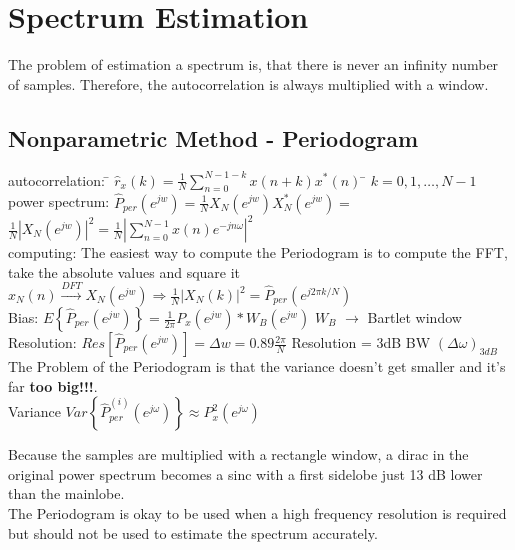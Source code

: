 \section{Spectrum Estimation}
The problem of estimation a spectrum is, that there is never an infinity number of samples.
Therefore, the autocorrelation is always multiplied with a window.

\subsection{Nonparametric Method - Periodogram }
\begin{tabbing}
autocorrelation: 	\= $\hat{r}_x(k) =\frac{1}{N} \sum \limits_{n=0}^{N-1-k} x(n+k)x^*(n)$   \hspace{4cm} \= $k=0,1,\ldots,N-1$ \\
power spectrum:  	\>  $\hat{P}_{per}(e^{jw}) = \frac{1}{N} X_N(e^{jw})X^*_N(e^{jw}) = $\\
\>					$\frac{1}{N}  \left\lvert X_N(e^{jw}) \right\rvert ^2 =  \frac{1}{N}  \left\lvert \sum\limits_{n=0}^{N-1} x(n)e^{-jn\omega} \right\rvert ^2$   \\
computing:  		\> The easiest way to compute the Periodogram is to compute the FFT, take the absolute values and square it\\
					\> $x_N(n) \xrightarrow{DFT} X_N(e^{jw}) \Rightarrow \frac{1}{N}  \left\lvert X_N(k) \right\rvert ^2 = \hat{P}_{per}(e^{j 2 \pi k/N})$ \\
Bias: 				\>  $E\left\lbrace \hat{P}_{per}(e^{jw}) \right\rbrace = \frac{1}{2 \pi}P_x(e^{jw})*W_B(e^{jw})$ \> $W_B$ $\to$ Bartlet window\\
Resolution: 		\>  $Res[\hat{P}_{per}(e^{jw})] = \Delta w = 0.89 \frac{2 \pi}{N}$\> Resolution = 3dB BW $(\Delta\omega)_{3dB}$\\
The Problem of the Periodogram is that the variance doesn't get smaller and it's far \textbf{too big!!!}.\\
Variance 			\> $Var\left\lbrace \hat{P}_{per}^{(i)}(e^{j\omega}) \right\rbrace \approx P^2_x(e^{j\omega})$\\
\end{tabbing}
Because the samples are multiplied with a rectangle window, a dirac in the original power spectrum becomes a sinc with a first sidelobe just 13 dB lower than the mainlobe.\\


The Periodogram is okay to be used when a high frequency resolution is required but should
not be used to estimate the spectrum accurately.

